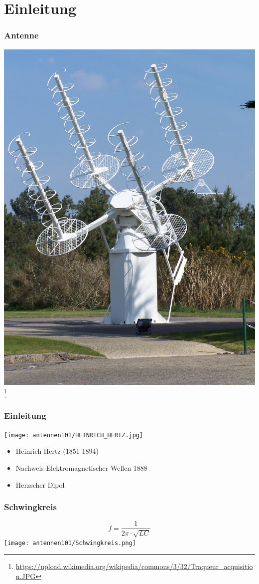 
\section*{Einleitung}

\begin{frame}
    \frametitle{Antenne}
      \begin{center}
        \includegraphics[width=.5\textwidth]{e11/Traqueur_acquisition.JPG}
        \footnote{\tiny \url{https://upload.wikimedia.org/wikipedia/commons/3/32/Traqueur_acquisition.JPG}}
    \end{center}
\end{frame}
  
\begin{frame}
	\frametitle{Einleitung}
\begin{minipage}{0.49\textwidth}
	\texttt{[image: antennen101/HEINRICH\_HERTZ.jpg]}
	\tiny \hyperlink{refs}{\cite{wc}}
\end{minipage}
\begin{minipage}{0.49\textwidth}
	\begin{itemize}
		\item Heinrich Hertz (1851-1894)
		\item Nachweis Elektromagnetischer Wellen 1888	
		\item Herzscher Dipol
	\end{itemize}
\end{minipage}
\end{frame}

\begin{frame}
    \frametitle{Schwingkreis}
    \begin{center} \huge
    $$f = \frac{1}{2  \pi \cdot \sqrt{LC}}$$
        \texttt{[image: antennen101/Schwingkreis.png]}
	\end{center}
\end{frame}


